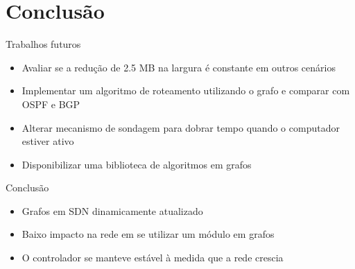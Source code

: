\section{Conclusão}


\begin{frame}{Trabalhos futuros}
    \begin{itemize}
        \item Avaliar se a redução de 2.5 MB na largura é constante em outros
            cenários
        \item Implementar um algoritmo de roteamento utilizando o grafo e
            comparar com OSPF e BGP
        \item Alterar mecanismo de sondagem para dobrar tempo quando o
            computador estiver ativo
        \item Disponibilizar uma biblioteca de algoritmos em grafos
    \end{itemize}
\end{frame}


\begin{frame}{Conclusão}
    \begin{itemize}
        \setlength{\itemsep}{.5cm}
        \item Grafos em SDN dinamicamente atualizado
        \item Baixo impacto na rede em se utilizar um módulo em grafos
        \item O controlador se manteve estável à medida que a rede crescia
    \end{itemize}
\end{frame}



